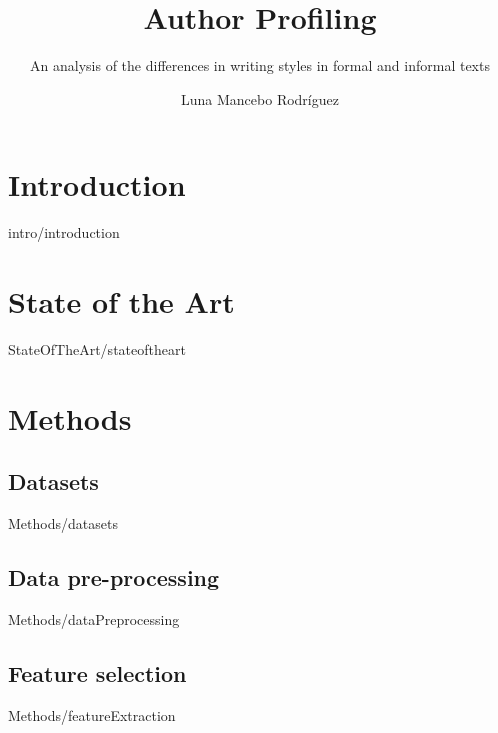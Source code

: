 \documentclass[epsbased,copyright,final,covers,extendedindex,firstnumbered,tfg,gnuplot]{main}
\title{Author Profiling}
\subtitle{An analysis of the differences in writing styles in formal and informal texts}
\author{Luna Mancebo Rodríguez}
\begin{document}
\chapter{Introduction\label{CAP:INTRODUCTION}}{intro/introduction}
\chapter{State of the Art\label{CAP:STATEOFTHEART}}{StateOfTheArt/stateoftheart}
\chapter{Methods\label{CAP:METHODS}}
\section{Datasets\label{SEC:DATASETS}}{Methods/datasets}
\section{Data pre-processing\label{SEC:DP}}{Methods/dataPreprocessing}
\section{Feature selection\label{SEC:FS}}{Methods/featureExtraction}
\printglossary
\end{document}
